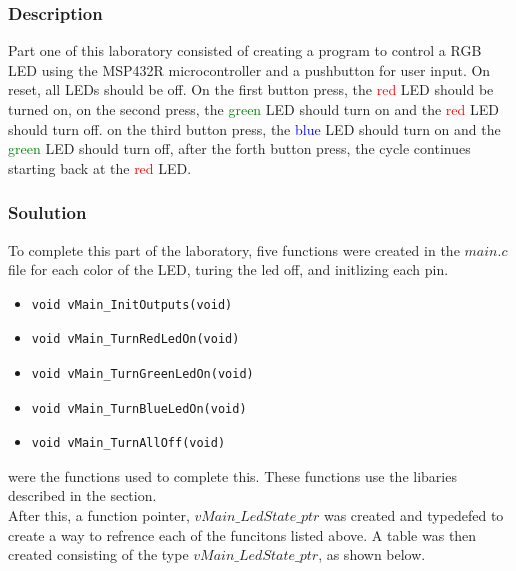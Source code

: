 \documentclass[11pt,a4paper]{article}
\begin{document}
\subsubsection{Description}
\label{SSec:desPart1}
Part one of this laboratory consisted of creating a program to control a RGB LED using the 
MSP432R microcontroller and a pushbutton for user input. On reset, all LEDs should be off. 
On the first button press, the \textcolor{red}{red} LED should be turned on, on the second press,
the \textcolor{green}{green} LED should turn on and the \textcolor{red}{red} LED should turn off.
on the third button press, the \textcolor{blue}{blue} LED should turn on and the \textcolor{green}{green}
LED should turn off, after the forth button press, the cycle continues starting back at the \textcolor{red}{red}
LED.

\subsubsection{Soulution}
To complete this part of the laboratory, five functions were created in the \(main.c\) file for each color of the LED, turing the led off, and initlizing each pin.
    \begin{itemize}
      \item \begin{lstlisting}[style=functionStyle] 
        void vMain_InitOutputs(void) 
      \end{lstlisting}
      \item \begin{lstlisting}[style=functionStyle] 
        void vMain_TurnRedLedOn(void) 
      \end{lstlisting} 
      \item \begin{lstlisting}[style=functionStyle] 
        void vMain_TurnGreenLedOn(void) 
      \end{lstlisting} 
      \item \begin{lstlisting}[style=functionStyle] 
        void vMain_TurnBlueLedOn(void) 
      \end{lstlisting} 
      \item \begin{lstlisting}[style=functionStyle] 
        void vMain_TurnAllOff(void) 
      \end{lstlisting}
    \end{itemize}
  were the functions used to complete this. These functions use the libaries described in the  section.
  \\
  After this, a function pointer, \(vMain\_LedState\_ptr\) was created and typedefed to create a way to refrence each of the funcitons
  listed above. A table was then created consisting of the type \(vMain\_LedState\_ptr\), as shown below.
\end{document}
